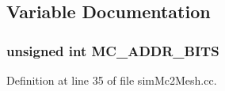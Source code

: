 \subsection{Variable Documentation}
\subsubsection[{MC\_\-ADDR\_\-BITS}]{\setlength{\rightskip}{0pt plus 5cm}unsigned int {\bf MC\_\-ADDR\_\-BITS}}\label{genericTPG__clubbed_8cc_5797f7fc969d8a7c02df4ba708ed734f}




Definition at line 35 of file simMc2Mesh.cc.